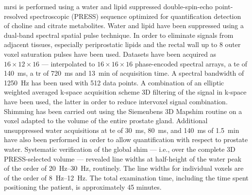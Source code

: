 \documentclass[final,3p,times,twocolumn]{elsarticle}
\begin{document}
\ac{mrsi} is performed using a water and lipid suppressed double-spin-echo
point-resolved spectroscopic (PRESS) sequence optimized for quantification
detection of choline and citrate metabolites.  Water and lipid have been
suppressed using a dual-band spectral spatial pulse technique.  In order to
eliminate signals from adjacent tissues, especially periprostatic lipids and
the rectal wall up to 8 outer voxel saturation pulses have been used.  Datasets
have been acquired as $16 \times 12 \times 16$ --- interpolated to $16 \times
16 \times 16$ phase-encoded spectral arrays, a \ac{te} of \SI{140}{\ms}, a
\ac{tr} of \SI{720}{\ms} and \SI{13}{\minute} of acquisition time.  A spectral
bandwidth of \SI{1250}{\hertz} has been used with 512 data points.  A
combination of an elliptic weighted averaged k-space acquisition scheme 3D
filtering of the signal in k-space have been used, the latter in order to
reduce intervoxel signal combination.  Shimming has been carried out using the
Siemenbens 3D Mapshim routine on a voxel adapted to the volume of the entire
prostate gland.  Additional unsuppressed water acquisitions at \ac{te} of
\SI{30}{\ms}, \SI{80}{\ms}, and \SI{140}{\ms} of \SI{1.5}{\minute} have also
been performed in order to allow quantification with respect to prostate water.
Systematic verification of the global shim --- i.e., over the complete 3D
PRESS-selected volume --- revealed line widths at half-height of the water peak
of the order of \SIrange{20}{30}{\hertz}, routinely.  The line widths for
individual voxels are of the order of \SIrange{8}{12}{\hertz}.  The total
examination time, including the time spent positioning the patient, is
approximately 45 minutes.
\end{document}
